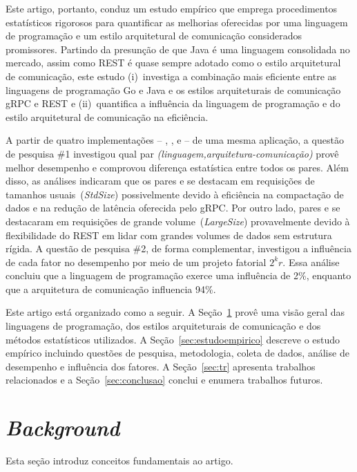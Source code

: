 Este artigo, portanto, conduz um estudo empírico que emprega procedimentos estatísticos rigorosos para quantificar as melhorias oferecidas por uma linguagem de programação e um estilo arquitetural de comunicação considerados promissores.
%
Partindo da presunção de que Java é uma linguagem consolidada no mercado, assim como REST é quase sempre adotado
como o estilo arquitetural de comunicação, este estudo 
(i)~investiga a combinação mais eficiente entre as linguagens de programação Go e Java e os estilos arquiteturais de
comunicação gRPC e REST e
(ii)~quantifica a influência da linguagem de programação e do estilo arquitetural de comunicação na eficiência.


A partir de quatro implementações -- \gogrpc{}, \gorest{}, \javagrpc{} e \javarest{} -- de uma
mesma aplicação, a questão de pesquisa \#1 investigou qual par {\em (linguagem,arquitetura-comunicação)} provê melhor desempenho e comprovou diferença estatística entre todos os pares. Além disso, as análises indicaram que os pares \gogrpc{} e \javagrpc{} se destacam em requisições de tamanhos usuais~({\em StdSize}) 
possivelmente devido à eficiência na compactação de dados e na redução de latência oferecida pelo gRPC.
Por outro lado, pares \gorest{} e \javarest{} se destacaram em requisições de grande volume~({\em LargeSize})
provavelmente devido à flexibilidade do REST em lidar com grandes volumes de dados sem estrutura rígida.
%
A questão de pesquisa \#2, de forma complementar, investigou a influência de cada fator no desempenho por meio de um projeto fatorial $2^kr$. Essa análise concluiu que a linguagem de programação exerce uma influência de 2\%, enquanto que
a arquitetura de comunicação influencia 94\%.   

Este artigo está organizado como a seguir. A Seção~\ref{sec:background} provê uma visão geral das linguagens de programação, dos estilos arquiteturais de comunicação e dos métodos estatísticos utilizados.
A Seção~\ref{sec:estudoempirico} descreve o estudo empírico incluindo questões de pesquisa, metodologia, coleta de dados, análise de desempenho e influência dos fatores. A Seção~\ref{sec:tr} apresenta trabalhos relacionados e a Seção~\ref{sec:conclusao} conclui e enumera trabalhos futuros.

\section{\em Background}
\label{sec:background}
Esta seção introduz conceitos fundamentais ao artigo.


